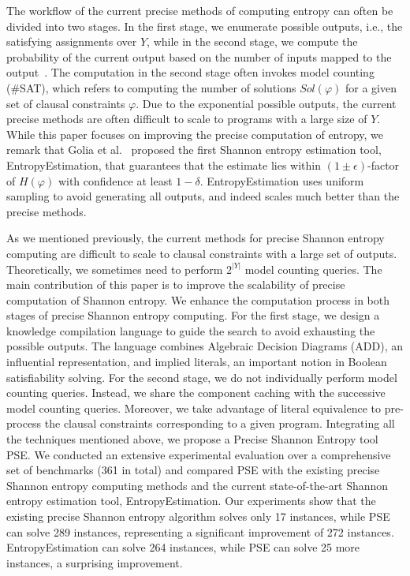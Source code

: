 The workflow of the current precise methods of computing entropy can often be divided into two stages. 
In the first stage, we enumerate possible outputs, i.e., the satisfying assignments over $Y$, while in the second stage, we compute the probability of the current output based on the number of inputs mapped to the output~\cite{golia2022scalable}.
The computation in the second stage often invokes model counting (\#SAT), which refers to computing the number of solutions $\mathit{Sol}(\varphi)$ for a given set of clausal constraints $\varphi$. 
Due to the exponential possible outputs, the current precise methods are often difficult to scale to programs with a large size of $Y$.
While this paper focuses on improving the precise computation of entropy, we remark that Golia et al.~\cite{golia2022scalable} proposed the first Shannon entropy estimation tool, EntropyEstimation, that guarantees that the estimate lies within $(1 \pm \epsilon)$-factor of $H(\varphi)$ with confidence at least $1-\delta$.
EntropyEstimation uses uniform sampling to avoid generating all outputs, and indeed scales much better than the precise methods. 

As we mentioned previously, the current methods for precise Shannon entropy computing are difficult to scale to clausal constraints with a large set of outputs.
Theoretically, we sometimes need to perform $2^{|Y|}$ model counting queries. 
The main contribution of this paper is to improve the scalability of precise computation of Shannon entropy. 
We enhance the computation process in both stages of precise Shannon entropy computing.
For the first stage, we design a knowledge compilation language to guide the search to avoid exhausting the possible outputs. 
The language combines Algebraic Decision Diagrams (ADD), an influential representation, and implied literals, an important notion in Boolean satisfiability solving.
For the second stage, we do not individually perform model counting queries.
Instead, we share the component caching with the successive model counting queries.
Moreover, we take advantage of literal equivalence to pre-process the clausal constraints corresponding to a given program.
Integrating all the techniques mentioned above, we propose a Precise Shannon Entropy tool PSE.
We conducted an extensive experimental evaluation over a comprehensive set of benchmarks (361 in total) and compared PSE with the existing precise Shannon entropy computing methods and the current state-of-the-art Shannon entropy estimation tool, EntropyEstimation.
Our experiments show that the existing precise Shannon entropy algorithm solves only 17 instances, while PSE can solve 289 instances, representing a significant improvement of 272 instances.
EntropyEstimation can solve 264 instances, while PSE can solve 25 more instances, a surprising improvement.

